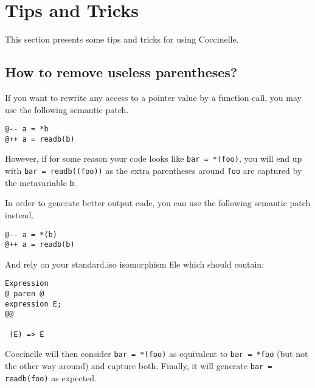 
\section{Tips and Tricks}

This section presents some tips and tricks for using Coccinelle.

\subsection{How to remove useless parentheses?}

If you want to rewrite any access to a pointer value by a function
call, you may use the following semantic patch.

\begin{lstlisting}[language=Cocci]
@-- a = *b
@++ a = readb(b)
\end{lstlisting}

However, if for some reason your code looks like \verb|bar = *(foo)|,
you will end up with \verb|bar = readb((foo))| as the extra
parentheses around \texttt{foo} are captured by the metavariable
\texttt{b}.

In order to generate better output code, you can use the following
semantic patch instead.
\begin{lstlisting}[language=Cocci]
@-- a = *(b)
@++ a = readb(b)
\end{lstlisting}

\noindent
And rely on your standard.iso isomorphism file which should contain:
\begin{lstlisting}[language=Cocci]
Expression
@ paren @
expression E;
@@

 (E) => E
\end{lstlisting}

Coccinelle will then consider \verb|bar = *(foo)| as equivalent to
\verb|bar = *foo| (but not the other way around) and capture both.
Finally, it will generate \verb|bar = readb(foo)| as expected.


